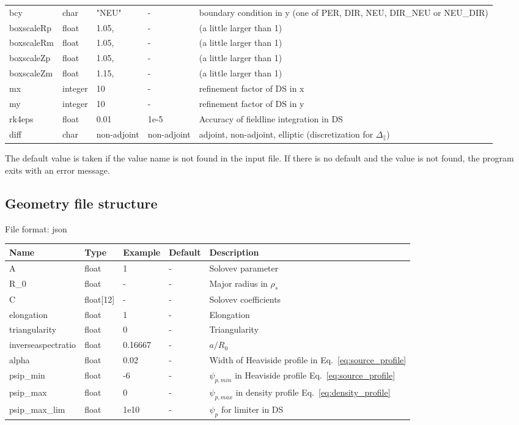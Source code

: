 \begin{longtable}{llll>{\RaggedRight}p{7cm}}
  bcy   & char & "NEU"      & - & boundary condition in y (one of PER, DIR, NEU, DIR\_NEU or NEU\_DIR) \\
  boxscaleRp & float &  1.05, & - & (a little larger than 1) \\
  boxscaleRm & float &  1.05, & - & (a little larger than 1) \\
  boxscaleZp & float &  1.05, & - & (a little larger than 1) \\
  boxscaleZm & float &  1.15, & - & (a little larger than 1) \\
  mx     & integer & 10 & - & refinement factor of DS in x \\
  my     & integer & 10 & - & refinement factor of DS in y \\
  rk4eps & float & 0.01 & 1e-5 & Accuracy of fieldline integration in DS \\
  diff       & char & non-adjoint & non-adjoint & adjoint, non-adjoint, elliptic (discretization for $\Delta_\parallel$) \\
\bottomrule
\end{longtable}

The default value is taken if the value name is not found in the input file. If there is no default and
the value is not found,
the program exits with an error message.

\subsection{Geometry file structure}
File format: json

\begin{longtable}{llll>{\RaggedRight}p{7cm}}
\toprule
\rowcolor{gray!50}\textbf{Name} &  \textbf{Type} & \textbf{Example} & \textbf{Default} & \textbf{Description}  \\ \midrule
    A      & float & 1 &  - & Solovev parameter \\
    R\_0   & float & - & -  & Major radius in $\rho_s$ \\
    C      & float[12] &  - & - & Solovev coefficients \\
    elongation & float & 1 & - & Elongation \\
    triangularity & float & 0 & - & Triangularity \\
    inverseaspectratio & float & 0.16667 & - & $a/R_0$ \\
    alpha  & float & 0.02 & - & Width of Heaviside profile in Eq.~\eqref{eq:source_profile} \\
    psip\_min & float & -6 & - & $\psi_{p,min}$ in Heaviside profile Eq.~\eqref{eq:source_profile} \\
    psip\_max & float & 0 & - & $\psi_{p,max}$ in density profile Eq.~\eqref{eq:density_profile} \\
    psip\_max\_lim & float & 1e10 & - & $\psi_p$ for limiter in DS \\
\bottomrule
\end{longtable}

